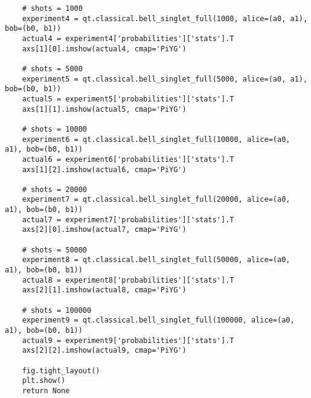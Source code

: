 \begin{verbatim}
    # shots = 1000
    experiment4 = qt.classical.bell_singlet_full(1000, alice=(a0, a1), bob=(b0, b1))
    actual4 = experiment4['probabilities']['stats'].T
    axs[1][0].imshow(actual4, cmap='PiYG')

    # shots = 5000
    experiment5 = qt.classical.bell_singlet_full(5000, alice=(a0, a1), bob=(b0, b1))
    actual5 = experiment5['probabilities']['stats'].T
    axs[1][1].imshow(actual5, cmap='PiYG')

    # shots = 10000
    experiment6 = qt.classical.bell_singlet_full(10000, alice=(a0, a1), bob=(b0, b1))
    actual6 = experiment6['probabilities']['stats'].T
    axs[1][2].imshow(actual6, cmap='PiYG')

    # shots = 20000
    experiment7 = qt.classical.bell_singlet_full(20000, alice=(a0, a1), bob=(b0, b1))
    actual7 = experiment7['probabilities']['stats'].T
    axs[2][0].imshow(actual7, cmap='PiYG')

    # shots = 50000
    experiment8 = qt.classical.bell_singlet_full(50000, alice=(a0, a1), bob=(b0, b1))
    actual8 = experiment8['probabilities']['stats'].T
    axs[2][1].imshow(actual8, cmap='PiYG')

    # shots = 100000
    experiment9 = qt.classical.bell_singlet_full(100000, alice=(a0, a1), bob=(b0, b1))
    actual9 = experiment9['probabilities']['stats'].T
    axs[2][2].imshow(actual9, cmap='PiYG')

    fig.tight_layout()
    plt.show()
    return None
\end{verbatim}

